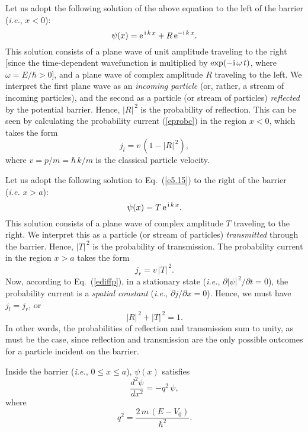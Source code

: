  Let us adopt the following solution
of the above equation to the left of the barrier ({\em i.e.}, $x<0$):
\begin{equation}
\psi(x) = {\rm e}^{\,{\rm i}\,k\,x} + R\,{\rm e}^{-{\rm i}\,k\,x}.
\end{equation}
This solution consists of a plane wave of unit amplitude traveling to
the right [since the time-dependent wavefunction is multiplied by 
$\exp(-{\rm i}\,\omega\,t)$, where $\omega=E/\hbar>0$], and a plane wave of complex amplitude $R$ traveling to
the left. We interpret the first plane wave as an {\em incoming particle}\/ (or, rather, a stream of incoming particles), and
the second as a particle (or stream of particles) {\em reflected}\/ by the potential barrier. Hence, $|R|^{\,2}$ is
the probability of reflection. This can be seen by calculating the
probability current (\ref{eprobc}) in the region $x<0$, which takes the form
\begin{equation}
j_l=v\,(1-|R|^{\,2}),
\end{equation}
where $v = p/m=\hbar\,k/m$ is the classical particle velocity.

Let us adopt the following solution to Eq.~(\ref{e5.15}) to the right
of the barrier ({\em i.e.} $x>a$):
\begin{equation}
\psi(x) = T\,{\rm e}^{\,{\rm i}\,k\,x}.
\end{equation}
This solution consists of a plane wave of complex amplitude $T$
traveling to the right. We interpret this as a particle (or stream of particles) {\em transmitted}\/ through
the barrier. Hence, $|T|^{\,2}$ is the probability of transmission. 
The probability current in the region $x>a$ takes the form
\begin{equation}
j_r = v\, |T|^{\,2}.
\end{equation}
Now, according to Eq.~(\ref{ediffp}), in a stationary state ({\em i.e.}, $\partial |\psi|^{\,2}/\partial t = 0$), the probability current is a {\em spatial constant}
({\em i.e.}, $\partial j/\partial x = 0$). Hence, we must have $j_l=j_r$, or
\begin{equation}\label{e5.20}
|R|^{\,2} + |T|^{\,2} = 1.
\end{equation}
In other words, the probabilities of reflection and transmission sum to
unity, as must be the case, since reflection and transmission are  the only possible outcomes for a
particle incident on the barrier.

Inside the barrier ({\em i.e.}, $0\leq x \leq a$), $\psi(x)$ satisfies
\begin{equation}\label{e5.21}
\frac{d^2 \psi}{d x^2} = - q^2\,\psi,
\end{equation}
where
\begin{equation}
q^2 = \frac{2\,m\,(E-V_0)}{\hbar^2}.
\end{equation}

